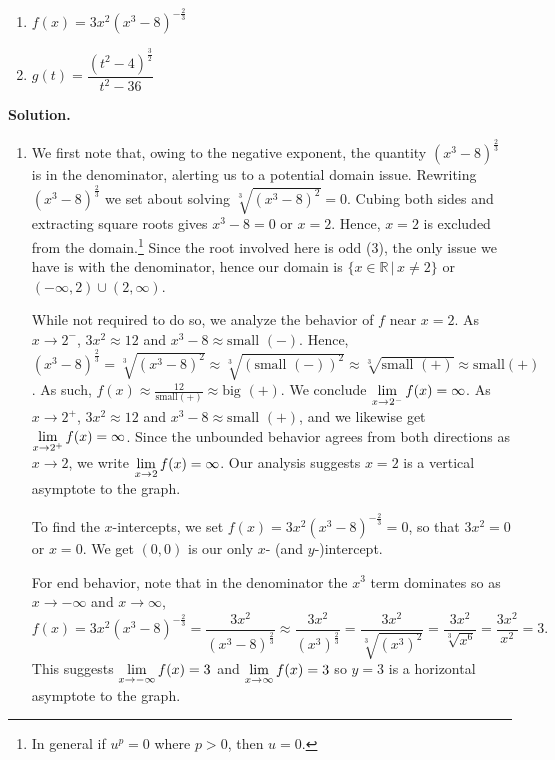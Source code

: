 \documentclass{ximera}
\begin{document}
\begin{example}
\begin{multicols}{2}
\begin{enumerate}

\item  $f(x) = 3x^2(x^3-8)^{-\frac{2}{3}}$ 

\item  $g(t) = \dfrac{(t^2-4)^{\frac{3}{2}}}{t^2-36}$

\end{enumerate}
\end{multicols}

{\bf Solution.}

\begin{enumerate}

\item We first note that, owing to the negative exponent, the quantity $(x^3-8)^{\frac{2}{3}}$ is in the denominator, alerting us to a potential domain issue.  Rewriting $(x^3-8)^{\frac{2}{3}}$ we set about solving $\sqrt[3]{(x^3-8)^2} = 0$.  Cubing both sides and extracting square roots gives $x^3-8=0$ or $x =2$.   Hence, $x =2$ is excluded from the domain.\footnote{In general if $u^{p} = 0$ where $p>0$, then $u =0$.}   Since the root involved here is odd ($3$), the only issue we have is with the denominator, hence our domain is $\{ x \in \mathbb{R} \, | \, x \neq 2 \}$ or $(-\infty, 2) \cup (2, \infty)$.  

While not required to do so, we analyze the behavior of $f$ near $x = 2$.  As $x \rightarrow 2^{-}$, $3x^2 \approx 12$ and $x^3-8 \approx \text{small $(-)$}$.  Hence, $(x^3-8)^{\frac{2}{3}} =\sqrt[3]{(x^3-8)^2} \approx \sqrt[3]{(\text{small $(-)$})^2} \approx \sqrt[3]{\text{small $(+)$}} \approx \text{small$(+)$}$.  As such,  $f(x) \approx \frac{12}{ \text{small$(+)$}} \approx \text{big $(+)$}$.  We conclude $\ds{\lim_{x \rightarrow 2^{-}} f(x) = \infty}$. As $x \rightarrow 2^{+}$, $3x^2 \approx 12$ and $x^3 - 8 \approx \text{small $(+)$}$, and we likewise get $\ds{\lim_{x \rightarrow 2^{+}} f(x) = \infty}$.  Since the unbounded behavior agrees from both directions as $x \rightarrow 2$, we write $\ds{\lim_{x \rightarrow 2} f(x) = \infty}$.   Our analysis suggests $x=2$ is a vertical asymptote to the graph.


To find the $x$-intercepts, we set $f(x) =  3x^2(x^3-8)^{-\frac{2}{3}} = 0$, so that $3x^2 = 0$ or $x = 0$.  We get $(0,0)$ is our only $x$- (and $y$-)intercept.  

For end behavior, note that in the denominator the $x^3$ term dominates so as $x \rightarrow -\infty$ and $x \rightarrow \infty$, \[ f(x) = 3x^2(x^3-8)^{-\frac{2}{3}} = \dfrac{3x^2}{(x^3-8)^{\frac{2}{3}}} \approx \dfrac{3x^2}{ (x^3)^{ \frac{2}{3} } } = \dfrac{3x^2}{\sqrt[3]{(x^3)^2}} = \dfrac{3x^2}{\sqrt[3]{x^6}} = \dfrac{3x^2}{x^2} = 3.\]  This suggests $\ds{\lim_{x \rightarrow -\infty} f(x) = 3}$ and $\ds{\lim_{x \rightarrow \infty} f(x) = 3}$ so $y = 3$ is a horizontal asymptote to the graph.


\end{enumerate}
\end{example}
\end{document}
